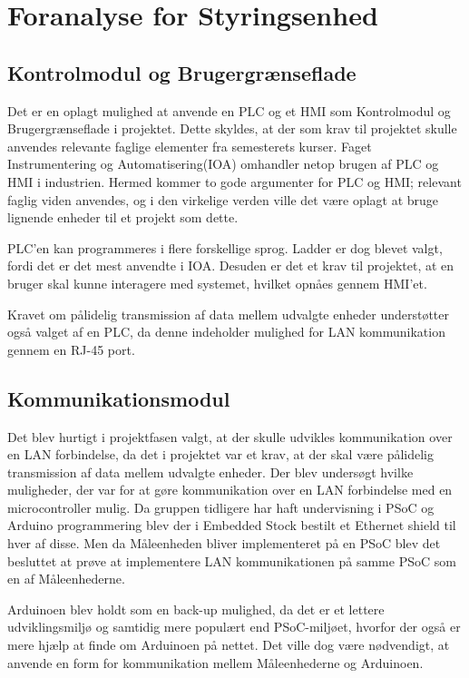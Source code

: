 
\section{Foranalyse for Styringsenhed}

\subsection{Kontrolmodul og Brugergrænseflade}
Det er en oplagt mulighed at anvende en PLC og et HMI som Kontrolmodul og Brugergrænseflade i projektet. Dette skyldes, at der som krav til projektet skulle anvendes relevante faglige elementer fra semesterets kurser. Faget Instrumentering og Automatisering(IOA) omhandler netop brugen af PLC og HMI i industrien. Hermed kommer to gode argumenter for PLC og HMI; relevant faglig viden anvendes, og i den virkelige verden ville det være oplagt at bruge lignende enheder til et projekt som dette.


PLC'en kan programmeres i flere forskellige sprog. Ladder er dog blevet valgt, fordi det er det mest anvendte i IOA. Desuden er det et krav til projektet, at en bruger skal kunne interagere med systemet, hvilket opnåes gennem HMI'et.


Kravet om pålidelig transmission af data mellem udvalgte enheder understøtter også valget af en PLC, da denne indeholder mulighed for LAN kommunikation gennem en RJ-45 port.

\subsection{Kommunikationsmodul}
Det blev hurtigt i projektfasen valgt, at der skulle udvikles kommunikation over en LAN forbindelse, da det i projektet var et krav, at der skal være pålidelig transmission af data mellem udvalgte enheder. Der blev undersøgt hvilke muligheder, der var for at gøre kommunikation over en LAN forbindelse med en microcontroller mulig. Da gruppen tidligere har haft undervisning i PSoC og Arduino programmering blev der i Embedded Stock bestilt et Ethernet shield til hver af disse. Men da Måleenheden bliver implementeret på en PSoC blev det besluttet at prøve at implementere LAN kommunikationen på samme PSoC som en af Måleenhederne. 


Arduinoen blev holdt som en back-up mulighed, da det er et lettere udviklingsmiljø og samtidig mere populært end PSoC-miljøet, hvorfor der også er mere hjælp at finde om Arduinoen på nettet. Det ville dog være nødvendigt, at anvende en form for kommunikation mellem Måleenhederne og Arduinoen. 






